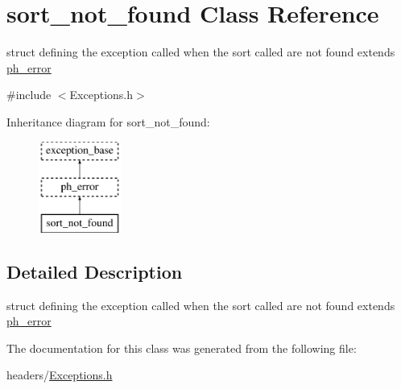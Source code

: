 \hypertarget{structsort__not__found}{\section{sort\-\_\-not\-\_\-found \-Class \-Reference}
\label{structsort__not__found}
}


struct defining the exception called when the sort called are not found extends \hyperlink{structph__error}{ph\-\_\-error}  




{\ttfamily \#include $<$\-Exceptions.\-h$>$}

\-Inheritance diagram for sort\-\_\-not\-\_\-found\-:\begin{figure}[H]
\begin{center}
\leavevmode
\includegraphics[height=3.000000cm]{structsort__not__found}
\end{center}
\end{figure}


\subsection{\-Detailed \-Description}
struct defining the exception called when the sort called are not found extends \hyperlink{structph__error}{ph\-\_\-error} 

\-The documentation for this class was generated from the following file\-:\begin{DoxyCompactItemize}
\item 
headers/\hyperlink{_exceptions_8h}{\-Exceptions.\-h}\end{DoxyCompactItemize}
